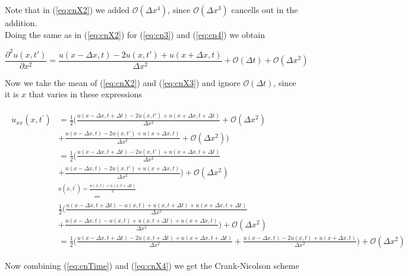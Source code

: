 \documentclass{article}
\begin{document}
Note that in (\ref{eq:cnX2}) we added $\mathcal{O}(\Delta x^4)$, since  $\mathcal{O}(\Delta x^3)$ cancells out in the addition. \\

Doing the same as in (\ref{eq:cnX2}) for (\ref{eq:cn3}) and (\ref{eq:cn4}) we obtain

\begin{equation}\label{eq:cnX3}
	\frac{\partial^2 u(x,t')}{\partial x^2} =\frac{u(x-\Delta x,t) - 2u(x,t') + u(x+\Delta x, t)}{\Delta x^2} +  \mathcal{O}(\Delta t) + \mathcal{O}(\Delta x^2)
\end{equation}

Now we take the mean of (\ref{eq:cnX2}) and (\ref{eq:cnX3}) and ignore $\mathcal{O} (\Delta t)$, since it is $x$ that varies in these expressions

\begin{subequations}
	\begin{align}
		\begin{split}
			u_{xx}(x, t^{'}) &=\frac{1}{2} \Big(\frac{u(x-\Delta x,t+ \Delta t)  - 2u(x,t') +  	u(x+\Delta x, t+\Delta t)}{\Delta x^2} + \mathcal{O}(\Delta x^2) \\
			&+  \frac{u(x-\Delta x,t) - 2u(x,t') + u(x+\Delta x, t)}{\Delta x^2} + \mathcal{O}(\Delta x^2)\Big)\\
			&= \frac{1}{2} \Big(\frac{u(x-\Delta x,t+ \Delta t)  - 2u(x,t') +  	u(x+\Delta x, t+\Delta t)}{\Delta x^2} \\
			& +  \frac{u(x-\Delta x,t) - 2u(x,t') + u(x+\Delta x, t)}{\Delta x^2} \Big) + \mathcal{O}(\Delta x^2)\\
			&\stackrel{u(x,t^{'}) = \frac{u(x,t) + u(x,t+\Delta t)}{2}}{=}\\
			&\frac{1}{2} \Big(\frac{u(x-\Delta x,t+ \Delta t)  - u(x,t) + u(x,t+\Delta t) +  	u(x+\Delta x, t+\Delta t)}{\Delta x^2} \\
			& +  \frac{u(x-\Delta x,t) - u(x,t) + u(x,t+\Delta t) + u(x+\Delta x, t)}{\Delta x^2} \Big) + \mathcal{O}(\Delta x^2)\\
			&= \frac{1}{2} \Big(\frac{u(x-\Delta x,t+ \Delta t) - 2u(x,t+\Delta t) +u(x + \Delta x,t+\Delta t)}{\Delta x^2} + \frac{u(x-\Delta x,t) - 2u(x,t) +u(x+ \Delta x,t)}{\Delta x^2} \Big) + \mathcal{O}(\Delta x^2)\label{eq:cnX4}
			\end{split}
	\end{align}
\end{subequations}

Now combining (\ref{eq:cnTime}) and (\ref{eq:cnX4}) we get the Crank-Nicolson scheme
\end{document}
